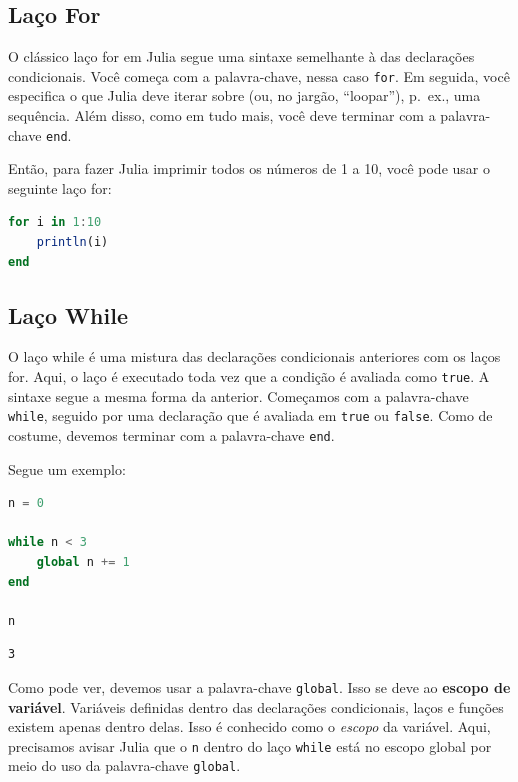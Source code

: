 \documentclass[
  notoc %
]{tufte-book}
\newcommand{\passthrough}[1]{#1}
\begin{document}
\hypertarget{sec:for}{%
\subsection{Laço For}\label{sec:for}}

O clássico laço for em Julia segue uma sintaxe semelhante à das
declarações condicionais. Você começa com a palavra-chave, nessa caso
\passthrough{\lstinline!for!}. Em seguida, você especifica o que Julia
deve iterar sobre (ou, no jargão, ``loopar''), p.~ex., uma sequência.
Além disso, como em tudo mais, você deve terminar com a palavra-chave
\passthrough{\lstinline!end!}.

Então, para fazer Julia imprimir todos os números de 1 a 10, você pode
usar o seguinte laço for:

\begin{lstlisting}[language=Julia]
for i in 1:10
    println(i)
end
\end{lstlisting}

\hypertarget{sec:while}{%
\subsection{Laço While}\label{sec:while}}

O laço while é uma mistura das declarações condicionais anteriores com
os laços for. Aqui, o laço é executado toda vez que a condição é
avaliada como \passthrough{\lstinline!true!}. A sintaxe segue a mesma
forma da anterior. Começamos com a palavra-chave
\passthrough{\lstinline!while!}, seguido por uma declaração que é
avaliada em \passthrough{\lstinline!true!} ou
\passthrough{\lstinline!false!}. Como de costume, devemos terminar com a
palavra-chave \passthrough{\lstinline!end!}.

Segue um exemplo:

\begin{lstlisting}[language=Julia]
n = 0

while n < 3
    global n += 1
end

n
\end{lstlisting}

\begin{lstlisting}[language=Output]
3
\end{lstlisting}

Como pode ver, devemos usar a palavra-chave
\passthrough{\lstinline!global!}. Isso se deve ao \textbf{escopo de
variável}. Variáveis definidas dentro das declarações condicionais,
laços e funções existem apenas dentro delas. Isso é conhecido como o
\emph{escopo} da variável. Aqui, precisamos avisar Julia que o
\passthrough{\lstinline!n!} dentro do laço
\passthrough{\lstinline!while!} está no escopo global por meio do uso da
palavra-chave \passthrough{\lstinline!global!}.
\end{document}
